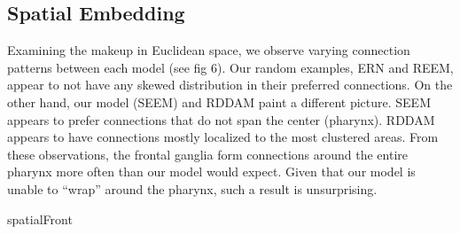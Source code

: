\subsection{Spatial Embedding}
Examining the makeup in Euclidean space, we observe varying connection patterns between each model (see fig 6). 
Our random examples, ERN and REEM, appear to not have any skewed distribution in their preferred connections. 
On the other hand, our model (SEEM) and RDDAM paint a different picture. 
SEEM appears to prefer connections that do not span the center (pharynx). 
RDDAM appears to have connections mostly localized to the most clustered areas.
From these observations, the \ce frontal ganglia form connections around the entire pharynx more often than our model would expect.
Given that our model is unable to ``wrap'' around the pharynx, such a result is unsurprising.

{spatialFront}